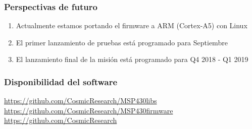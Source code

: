 \documentclass[numfooter]{beamer}
\begin{document}
    \begin{frame}
        \frametitle{Perspectivas de futuro}
        \begin{enumerate}
            \item Actualmente estamos portando el firmware a ARM (Cortex-A5) con Linux
            \item El primer lanzamiento de pruebas está programado para Septiembre
            \item El lanzamiento final de la misión está programado para Q4 2018 - Q1 2019
        \end{enumerate}
    \end{frame}
    \begin{frame}
        \frametitle{Disponibilidad del software}
        \url{https://github.com/CosmicResearch/MSP430libs} \\
        \url{https://github.com/CosmicResearch/MSP430firmware} \\
        \url{https://github.com/CosmicResearch}
    \end{frame}
    
\end{document}
